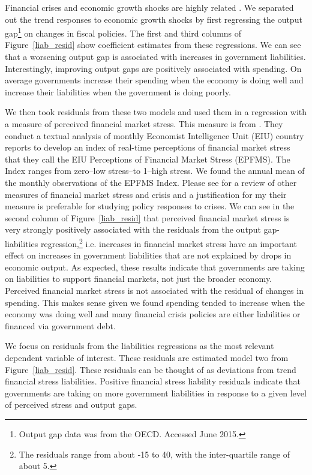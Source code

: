 \documentclass[]{article}
\begin{document}
Financial crises and economic growth shocks are highly related \cite[see][]{Reinhart2009}. We separated out the trend responses to economic growth shocks by first regressing the output gap\footnote{Output gap data was from the OECD. Accessed June 2015.} on changes in fiscal policies. The first and third columns of Figure~\ref{liab_resid} show coefficient estimates from these regressions. We can see that a worsening output gap is associated with increases in government liabilities. Interestingly, improving output gaps are positively associated with spending. On average governments increase their spending when the economy is doing well and increase their liabilities when the government is doing poorly.

We then took residuals from these two models and used them in a regression with a measure of perceived financial market stress. This measure is from \cite{gandrudHallEPFMS}. They conduct a textual analysis of monthly Economist Intelligence Unit (EIU) country reports to develop an index of real-time perceptions of financial market stress that they call the EIU Perceptions of Financial Market Stress (EPFMS). The Index ranges from zero--low stress--to 1--high stress. We found the annual mean of the monthly observations of the EPFMS Index. Please see \cite{gandrudHallEPFMS} for a review of other measures of financial market stress and crisis and a justification for my their measure is preferable for studying policy responses to crises. We can see in the second column of Figure~\ref{liab_resid} that perceived financial market stress is very strongly positively associated with the residuals from the output gap-liabilities regression,\footnote{The residuals range from about -15 to 40, with the inter-quartile range of about 5.} i.e. increases in financial market stress have an important effect on increases in government liabilities that are not explained by drops in economic output. As expected, these results indicate that governments are taking on liabilities to support financial markets, not just the broader economy. Perceived financial market stress is not associated with the residual of changes in spending. This makes sense given we found spending tended to increase when the economy was doing well and many financial crisis policies are either liabilities or financed via government debt.

We focus on residuals from the liabilities regressions as the most relevant dependent variable of interest. These residuals are estimated model two from Figure~\ref{liab_resid}. These residuals can be thought of as deviations from trend financial stress liabilities. Positive financial stress liability residuals indicate that governments are taking on more government liabilities in response to a given level of perceived stress and output gaps.
\end{document}
